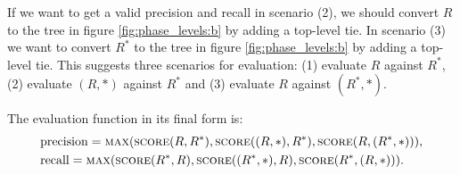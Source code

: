 If we want to get a valid precision and recall in scenario (2), we should convert $R$ to the tree in figure \ref{fig:phase_levels:b} by adding a top-level tie. In scenario (3) we want to convert $R^*$ to the tree in figure \ref{fig:phase_levels:b} by adding a top-level tie. This suggests three scenarios for evaluation: (1) evaluate $R$ against $R^*$, (2) evaluate $(R, *)$ against $R^*$ and (3) evaluate $R$ against $(R^*, *)$. 

The evaluation function in its final form is:
\begin{align}
\label{eq:evaluation}
&\mathrm{precision} = \textsc{max}(\textsc{score}(R, R^*), \textsc{score}((R, *), R^*), \textsc{score}(R, (R^*, *))),\\
&\mathrm{recall} = \textsc{max}(\textsc{score}(R^*, R), \textsc{score}((R^*, *), R), \textsc{score}(R^*, (R, *))).
\end{align}





